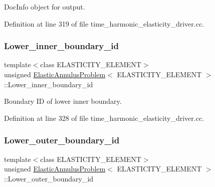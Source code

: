 Doc\+Info object for output. 



Definition at line 319 of file time\+\_\+harmonic\+\_\+elasticity\+\_\+driver.\+cc.

\mbox{\label{classElasticAnnulusProblem_a810f81246ad9ffdc4206016bfb8a56da}} 
\subsubsection{\texorpdfstring{Lower\+\_\+inner\+\_\+boundary\+\_\+id}{Lower\_inner\_boundary\_id}}
{\footnotesize\ttfamily template$<$class E\+L\+A\+S\+T\+I\+C\+I\+T\+Y\+\_\+\+E\+L\+E\+M\+E\+NT$>$ \\
unsigned \hyperlink{classElasticAnnulusProblem}{Elastic\+Annulus\+Problem}$<$ E\+L\+A\+S\+T\+I\+C\+I\+T\+Y\+\_\+\+E\+L\+E\+M\+E\+NT $>$\+::Lower\+\_\+inner\+\_\+boundary\+\_\+id\hspace{0.3cm}{\ttfamily [private]}}



Boundary ID of lower inner boundary. 



Definition at line 328 of file time\+\_\+harmonic\+\_\+elasticity\+\_\+driver.\+cc.

\mbox{\label{classElasticAnnulusProblem_a21dfc08e2f80d32b674670b1194f7386}} 
\subsubsection{\texorpdfstring{Lower\+\_\+outer\+\_\+boundary\+\_\+id}{Lower\_outer\_boundary\_id}}
{\footnotesize\ttfamily template$<$class E\+L\+A\+S\+T\+I\+C\+I\+T\+Y\+\_\+\+E\+L\+E\+M\+E\+NT$>$ \\
unsigned \hyperlink{classElasticAnnulusProblem}{Elastic\+Annulus\+Problem}$<$ E\+L\+A\+S\+T\+I\+C\+I\+T\+Y\+\_\+\+E\+L\+E\+M\+E\+NT $>$\+::Lower\+\_\+outer\+\_\+boundary\+\_\+id\hspace{0.3cm}{\ttfamily [private]}}



